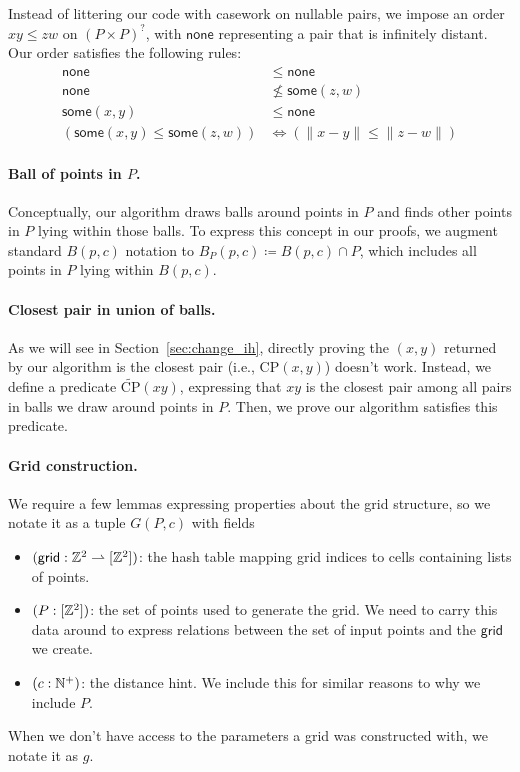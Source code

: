 \documentclass{article}
\begin{document}
Instead of littering our code with casework on nullable pairs, we impose an order $x\!y \leq z\!w$ on $(P \times P)^?$, with $\mathsf{none}$ representing a pair that is infinitely distant.
Our order satisfies the following rules:
\begin{align*}
  \mathsf{none} & \leq \mathsf{none} \\
  \mathsf{none} & \not\leq \mathsf{some}(z, w) \\
  \mathsf{some}(x, y) & \leq \mathsf{none} \\
  (\mathsf{some}(x, y) \leq \mathsf{some}(z, w)) &\Leftrightarrow (\|x - y\| \leq \|z - w\|)
\end{align*}

\paragraph{Ball of points in $P$.}
Conceptually, our algorithm draws balls around points in $P$ and finds other points in $P$ lying within those balls.
To express this concept in our proofs, we augment standard $B(p, c)$ notation to $B_{P}(p, c) \coloneqq B(p, c) \cap P$, which includes all points in $P$ lying within $B(p, c)$.

\paragraph{Closest pair in union of balls.}
As we will see in Section~\ref{sec:change_ih}, directly proving the $(x, y)$ returned by our algorithm is the closest pair (i.e., $\text{CP}(x, y)$) doesn't work.
Instead, we define a predicate $\widetilde{\text{CP}}(x\!y)$, expressing that $x\!y$ is the closest pair among all pairs in balls we draw around points in $P$.
Then, we prove our algorithm satisfies this predicate.

\paragraph{Grid construction.}
We require a few lemmas expressing properties about the grid structure, so we notate it as a tuple $G(P, c)$ with fields
\begin{itemize}
  \item $(\mathsf{grid} : \mathbb{Z}^2 \rightharpoonup [\mathbb{Z}^2])$: the hash table mapping grid indices to cells containing lists of points.
  \item $(P : [\mathbb{Z}^2])$: the set of points used to generate the grid.
  We need to carry this data around to express relations between the set of input points and the $\mathsf{grid}$ we create.
  \item $(c : \mathbb{N}^+)$: the distance hint.
  We include this for similar reasons to why we include $P$.
\end{itemize}
When we don't have access to the parameters a grid was constructed with, we notate it as $g$.
\end{document}
